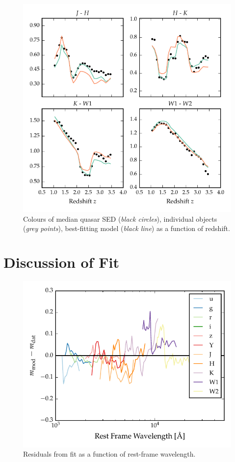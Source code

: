 \begin{figure}
\includegraphics[width=\textwidth]{figures/chapter05/sed_color_plot_2.pdf}
\caption[{Colours of median quasar SED, individual objects, best-fitting  model as a function of redshift.}]{Colours of median quasar SED ({\it black circles}), individual objects ({\it grey points}), best-fitting  model ({\it black line}) as a function of redshift.}
  \label{fig:color_2}
\end{figure} 

\section{Discussion of Fit}

\begin{figure}
  \centering
  \includegraphics[width=\textwidth]{figures/chapter05/model_residuals.pdf}
  \caption[{Residuals from fit as a function of rest-frame wavelength.}]{Residuals from fit as a function of rest-frame wavelength. }
  \label{fig:residuals}
\end{figure}

